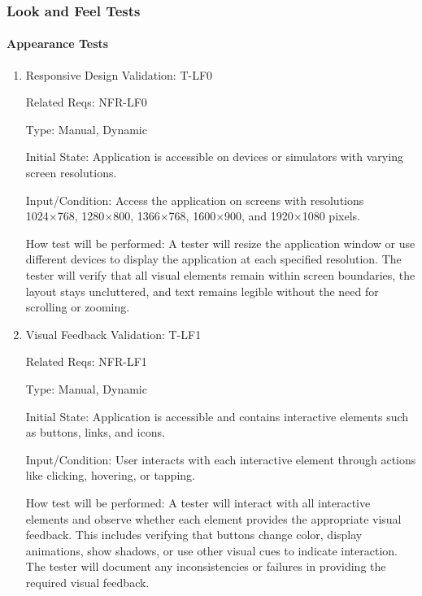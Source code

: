 \documentclass[12pt, titlepage]{article}
\begin{document}





\subsubsection{Look and Feel Tests}
\paragraph{Appearance Tests}
\begin{enumerate}
\item{Responsive Design Validation: T-LF0\\}

Related Reqs: NFR-LF0

Type: Manual, Dynamic

Initial State: Application is accessible on devices or simulators with varying screen resolutions.

Input/Condition: Access the application on screens with resolutions 1024×768, 1280×800, 1366×768, 1600×900, and 1920×1080 pixels.

How test will be performed: A tester will resize the application window or use different devices to display the application at each specified resolution. The tester will verify that all visual elements remain within screen boundaries, the layout stays uncluttered, and text remains legible without the need for scrolling or zooming.

\item{Visual Feedback Validation: T-LF1\\}

Related Reqs: NFR-LF1

Type: Manual, Dynamic

Initial State: Application is accessible and contains interactive elements such as buttons, links, and icons.

Input/Condition: User interacts with each interactive element through actions like clicking, hovering, or tapping.

How test will be performed: A tester will interact with all interactive elements and observe whether each element provides the appropriate visual feedback. This includes verifying that buttons change color, display animations, show shadows, or use other visual cues to indicate interaction. The tester will document any inconsistencies or failures in providing the required visual feedback.
\end{enumerate}
\end{document}

